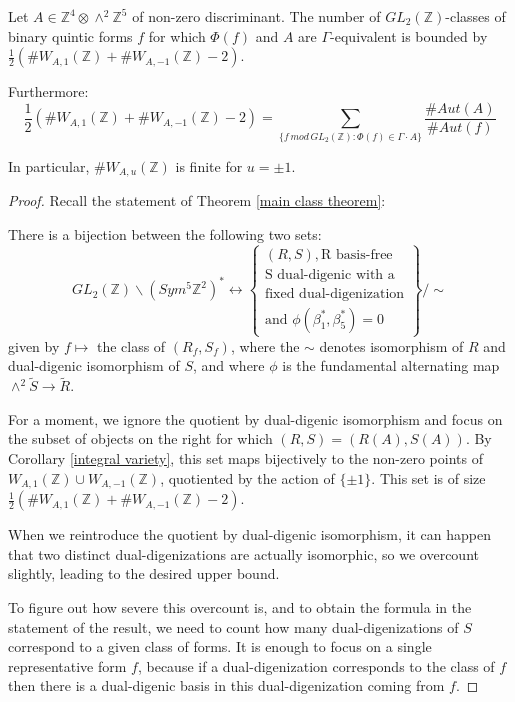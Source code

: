\documentclass{report}
\begin{document}
\begin{corollary}
Let $A \in \mathbb{Z}^4 \otimes \wedge^2 \mathbb{Z}^5$ of non-zero discriminant.  The number of $GL_2(\mathbb{Z})$-classes of binary quintic forms $f$ for which $\Phi(f)$ and $A$ are $\Gamma$-equivalent is bounded by $\frac{1}{2}(\# W_{A,1}(\mathbb{Z}) + \# W_{A,-1}(\mathbb{Z}) - 2)$.

Furthermore:
\begin{equation}
\frac{1}{2}(\# W_{A,1}(\mathbb{Z}) + \# W_{A,-1}(\mathbb{Z}) - 2) = \sum_{\{f \, mod \, GL_2(\mathbb{Z}) : \Phi(f) \in \Gamma \cdot A \} } \frac{\#Aut(A)}{\#Aut(f)}
\end{equation}

In particular, $\# W_{A,u}(\mathbb{Z})$ is finite for $u = \pm 1$.
\end{corollary}
\begin{proof}
Recall the statement of Theorem \ref{main class theorem}:

There is a bijection between the following two sets:
\begin{equation}
GL_2(\mathbb{Z}) \backslash (Sym^5 \mathbb{Z}^2)^* \leftrightarrow
\left \{
\begin{array}{l}
(R,S), \text{R basis-free} \\
\text{S dual-digenic with a} \\
\text{fixed dual-digenization} \\
\text{and } \phi(\beta_1^*,\beta_5^*) = 0 
\end{array}
\right \}
 / \sim
\end{equation}
given by $f \mapsto$ the class of $(R_f, S_f)$, where the $\sim$ denotes isomorphism of $R$ and dual-digenic isomorphism of $S$, and where $\phi$ is the fundamental alternating map $\wedge^2 \tilde{S} \to \tilde{R}$.

For a moment, we ignore the quotient by dual-digenic isomorphism and focus on the subset of objects on the right for which $(R,S) = (R(A),S(A))$.  By Corollary \ref{integral variety}, this set maps bijectively to the non-zero points of $W_{A,1}(\mathbb{Z}) \cup W_{A,-1}(\mathbb{Z})$, quotiented by the action of $\{\pm 1\}$.  This set is of size $\frac{1}{2}(\# W_{A,1}(\mathbb{Z}) + \# W_{A,-1}(\mathbb{Z}) - 2)$.

When we reintroduce the quotient by dual-digenic isomorphism, it can happen that two distinct dual-digenizations are actually isomorphic, so we overcount slightly, leading to the desired upper bound.

To figure out how severe this overcount is, and to obtain the formula in the statement of the result, we need to count how many dual-digenizations of $S$ correspond to a given class of forms.  It is enough to focus on a single representative form $f$, because if a dual-digenization corresponds to the class of $f$ then there is a dual-digenic basis in this dual-digenization coming from $f$.


\end{proof}
\end{document}
